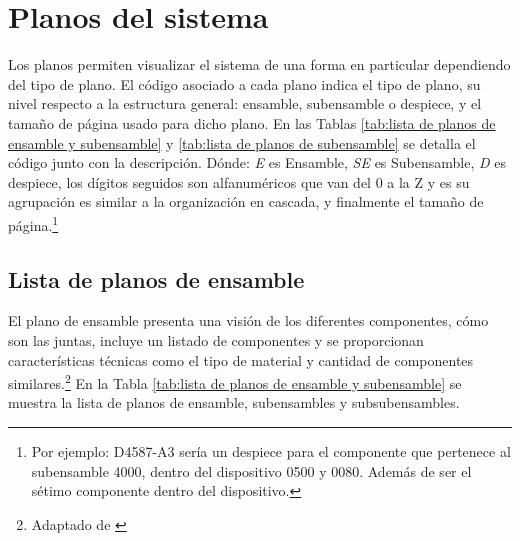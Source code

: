 \vspace{-2.0em}

\section{Planos del sistema}
\label{ssec:planos del sistema}

Los planos permiten visualizar el sistema de una forma en particular dependiendo del tipo de plano. El código asociado a cada plano indica el tipo de plano, su nivel respecto a la estructura general: ensamble, subensamble o despiece, y el tamaño de página usado para dicho plano. En las Tablas \ref{tab:lista de planos de ensamble y subensamble} y \ref{tab:lista de planos de subensamble} se detalla el código junto con la descripción. Dónde: \textit{E} es Ensamble, \textit{SE} es Subensamble, \textit{D} es despiece, los dígitos seguidos son alfanuméricos que van del 0 a la Z y es su agrupación es similar a la organización en cascada, y finalmente el tamaño de página.\footnote{Por ejemplo: D4587-A3 sería un despiece para el componente que pertenece al subensamble 4000, dentro del dispositivo 0500 y 0080. Además de ser el sétimo componente dentro del dispositivo.}

\vspace{-2.0 em}
\subsection{Lista de planos de ensamble}

El plano de ensamble presenta una visión de los diferentes componentes, cómo son las juntas, incluye un listado de componentes y se proporcionan características técnicas como el  tipo de material y cantidad de componentes similares.\footnote{Adaptado de \cite{Goetsch2010}} En la Tabla \ref{tab:lista de planos de ensamble y subensamble} se muestra la lista de planos de ensamble, subensambles y subsubensambles.

